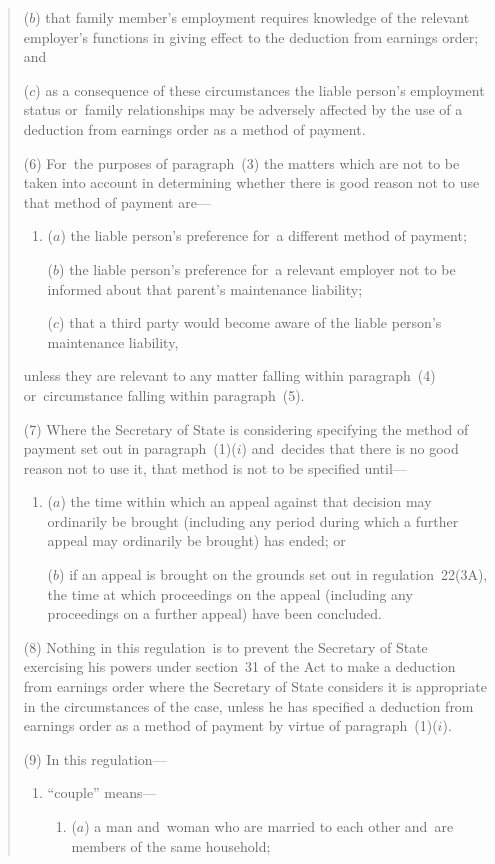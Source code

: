 \documentclass[12pt,a4paper]{article}
\begin{document}
\begin{enumerate}
\begin{quotation}
\begin{enumerate}
($b$) that family member’s employment requires knowledge of the relevant employer’s functions in giving effect to the deduction from earnings order; and

($c$) as a consequence of these circumstances the liable person’s employment status or~family relationships may be adversely affected by the use of a deduction from earnings order as a method of payment.
\end{enumerate}

(6) For~the purposes of paragraph~(3) the matters which are not to be taken into account in determining whether there is good reason not to use that method of payment are—
\begin{enumerate}\item[]
($a$) the liable person’s preference for~a different method of payment;

($b$) the liable person’s preference for~a relevant employer not to be informed about that parent’s maintenance liability;

($c$) that a third party would become aware of the liable person’s maintenance liability,
\end{enumerate}
unless they are relevant to any matter falling within paragraph~(4) or~circumstance falling within paragraph~(5).

(7) Where the Secretary of State is considering specifying the method of payment set out in paragraph~(1)($i$)  and~decides that there is no good reason not to use it, that method is not to be specified until—
\begin{enumerate}\item[]
($a$) the time within which an appeal against that decision may ordinarily be brought (including any period during which a further appeal may ordinarily be brought) has ended; or

($b$) if an appeal is brought on the grounds set out in regulation~22(3A), the time at which proceedings on the appeal (including any proceedings on a further appeal) have been concluded.
\end{enumerate}

(8) Nothing in this regulation~is to prevent the Secretary of State exercising his powers under section~31 of the Act to make a deduction from earnings order where the Secretary of State considers it is appropriate in the circumstances of the case, unless he has specified a deduction from earnings order as a method of payment by virtue of paragraph~(1)($i$).

(9) In this regulation—
\begin{enumerate}\item[]
“couple” means—
\begin{enumerate}\item[]
($a$) 
a man and~woman who are married to each other and~are members of the same household;


\end{enumerate}
\end{enumerate}
\end{quotation}
\end{enumerate}
\end{document}
